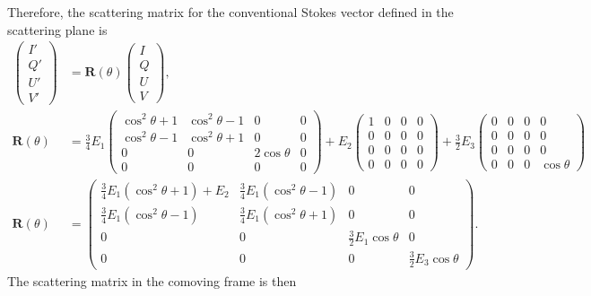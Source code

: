 \documentclass[english,a4paper]{my_memo}
\begin{document}
Therefore, the scattering matrix for the conventional Stokes
vector defined in the scattering plane is
\begin{align*}
\left(\begin{array}{c} I'\\ Q'\\ U'\\ V'\end{array}\right)
& = \mathbf{R}(\theta)\left(\begin{array}{c} I\\ Q\\ U\\ V\end{array}\right),\\
\mathbf{R}(\theta) & = \tfrac{3}{4}E_{1}\!\left(\begin{array}{cccc}
\cos^{2}\theta+1 & \cos^{2}\theta-1 & 0 & 0\\
\cos^{2}\theta-1 & \cos^{2}\theta+1 & 0 & 0\\
0 & 0 & 2\cos\theta & 0\\
0 & 0 & 0 & 0
\end{array}\right)
+E_{2}\!\left(\begin{array}{cccc}
1 & 0 & 0 & 0\\
0 & 0 & 0 & 0\\
0 & 0 & 0 & 0\\
0 & 0 & 0 & 0
\end{array}\right)
+\tfrac{3}{2}E_{3}\!\left(\begin{array}{cccc}
0 & 0 & 0 & 0\\
0 & 0 & 0 & 0\\
0 & 0 & 0 & 0\\
0 & 0 & 0 & \cos\theta
\end{array}\right)\\[2pt]
\mathbf{R}(\theta) & = \left(\begin{array}{cccc}
\tfrac{3}{4}E_{1}\!\left(\cos^{2}\theta+1\right)+E_{2} & \tfrac{3}{4}E_{1}\!\left(\cos^{2}\theta-1\right) & 0 & 0\\
\tfrac{3}{4}E_{1}\!\left(\cos^{2}\theta-1\right) & \tfrac{3}{4}E_{1}\!\left(\cos^{2}\theta+1\right) & 0 & 0\\
0 & 0 & \tfrac{3}{2}E_{1}\cos\theta & 0\\
0 & 0 & 0 & \tfrac{3}{2}E_{3}\cos\theta
\end{array}\right).
\end{align*}
The scattering matrix in the comoving frame is then
\end{document}
